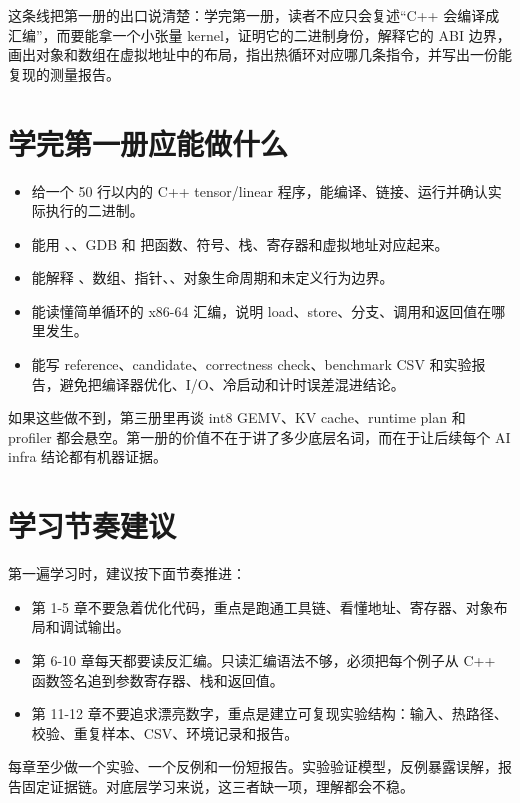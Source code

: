 这条线把第一册的出口说清楚：学完第一册，读者不应只会复述“C++ 会编译成汇编”，而要能拿一个小张量 kernel，证明它的二进制身份，解释它的 ABI 边界，画出对象和数组在虚拟地址中的布局，指出热循环对应哪几条指令，并写出一份能复现的测量报告。

\section*{学完第一册应能做什么}

\begin{itemize}
  \item 给一个 50 行以内的 C++ tensor/linear 程序，能编译、链接、运行并确认实际执行的二进制。
  \item 能用 、、GDB 和  把函数、符号、栈、寄存器和虚拟地址对应起来。
  \item 能解释 、数组、指针、、对象生命周期和未定义行为边界。
  \item 能读懂简单循环的 x86-64 汇编，说明 load、store、分支、调用和返回值在哪里发生。
  \item 能写 reference、candidate、correctness check、benchmark CSV 和实验报告，避免把编译器优化、I/O、冷启动和计时误差混进结论。
\end{itemize}

如果这些做不到，第三册里再谈 int8 GEMV、KV cache、runtime plan 和 profiler 都会悬空。第一册的价值不在于讲了多少底层名词，而在于让后续每个 AI infra 结论都有机器证据。

\section*{学习节奏建议}

第一遍学习时，建议按下面节奏推进：

\begin{itemize}
  \item 第 1-5 章不要急着优化代码，重点是跑通工具链、看懂地址、寄存器、对象布局和调试输出。
  \item 第 6-10 章每天都要读反汇编。只读汇编语法不够，必须把每个例子从 C++ 函数签名追到参数寄存器、栈和返回值。
  \item 第 11-12 章不要追求漂亮数字，重点是建立可复现实验结构：输入、热路径、校验、重复样本、CSV、环境记录和报告。
\end{itemize}

每章至少做一个实验、一个反例和一份短报告。实验验证模型，反例暴露误解，报告固定证据链。对底层学习来说，这三者缺一项，理解都会不稳。

